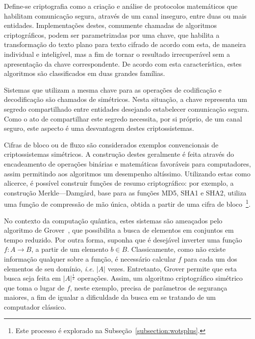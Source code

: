 \documentclass{ufsctex/ufsctex}
\newcommand{\length}[1]{\vert{} #1 \vert{}}
\begin{document}
Define-se criptografia como a criação e análise de protocolos matemáticos que
habilitam comunicação segura, através de um canal inseguro, entre duas ou mais
entidades. Implementações destes, comumente chamadas de algoritmos
criptográficos, podem ser parametrizadas por uma chave, que habilita a
transformação do texto plano para texto cifrado de acordo com esta, de maneira
individual e inteligível, mas a fim de tornar o resultado irrecuperável sem a
apresentação da chave correspondente. De acordo com esta característica, estes
algoritmos são classificados em duas grandes famílias.

Sistemas que utilizam a mesma chave para as operações de codificação e
decodificação são chamados de simétricos. Nesta situação, a chave representa um
segredo compartilhado entre entidades desejando estabelecer comunicação segura.
Como o ato de compartilhar este segredo necessita, por si próprio, de um canal
seguro, este aspecto é uma desvantagem destes criptossistemas.

Cifras de bloco ou de fluxo são considerados exemplos convencionais de
criptossistemas simétricos. A construção destes geralmente é feita através do
encadeamento de operações binárias e matemáticas favoráveis para computadores,
assim permitindo aos algoritmos um desempenho altíssimo. Utilizando estas como
alicerce, é possível construir funções de resumo criptográfico: por exemplo, a
construção Merkle---Damgård, base para as funções MD5,
SHA1 e SHA2, utiliza uma função de
compressão de mão única, obtida a partir de uma cifra de bloco~\cite[Algoritmo
9.41]{Menezes:book:1996}\footnote{Este processo é explorado na
Subseção~\ref{subsection:wotsplus}.}.

No contexto da computação quântica, estes sistemas são ameaçados pelo algoritmo
de Grover~\cite{Grover:inproc:1996:may}, que possibilita a busca de elementos
em conjuntos em tempo reduzido. Por outra forma, suponha que é desejável
inverter uma função $f : A \longrightarrow B$, a partir de um elemento $b \in
B$. Classicamente, como não existe informação qualquer sobre a função, é
necessário calcular $f$ para cada um dos elementos de seu domínio, \emph{i.e.}
$\length{A}$\simbolo{$\length{\omega}$}{Tamanho da palavra $\omega$} vezes.
Entretanto, Grover permite que esta busca seja feita em
$\length{A}^{\frac{1}{2}}$ operações. Assim, um algoritmo criptográfico
simétrico que toma o lugar de $f$, neste exemplo, precisa de parâmetros de
segurança maiores, a fim de igualar a dificuldade da busca em se tratando de um
computador clássico.
\end{document}
